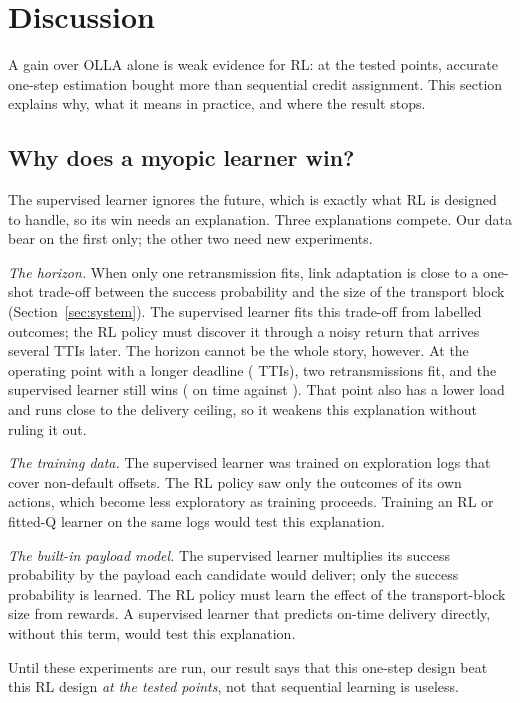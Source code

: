 \section{Discussion}\label{sec:discussion}
A gain over OLLA alone is weak evidence for RL: at the tested points, accurate one-step estimation bought more than sequential credit assignment. This section explains why, what it means in practice, and where the result stops.

\subsection{Why does a myopic learner win?}\label{sec:myopic}
The supervised learner ignores the future, which is exactly what RL is designed to handle, so its win needs an explanation. Three explanations compete. Our data bear on the first only; the other two need new experiments.

\emph{The horizon.} When only one retransmission fits, link adaptation is close to a one-shot trade-off between the success probability and the size of the transport block (Section~\ref{sec:system}). The supervised learner fits this trade-off from labelled outcomes; the RL policy must discover it through a noisy return that arrives several TTIs later. The horizon cannot be the whole story, however. At the operating point with a longer deadline (\NGthreeDeadline{} TTIs), two retransmissions fit, and the supervised learner still wins ( on time against ). That point also has a lower load and runs close to the delivery ceiling, so it weakens this explanation without ruling it out.

\emph{The training data.} The supervised learner was trained on exploration logs that cover non-default offsets. The RL policy saw only the outcomes of its own actions, which become less exploratory as training proceeds. Training an RL or fitted-Q learner on the same logs would test this explanation.

\emph{The built-in payload model.} The supervised learner multiplies its success probability by the payload each candidate would deliver; only the success probability is learned. The RL policy must learn the effect of the transport-block size from rewards. A supervised learner that predicts on-time delivery directly, without this term, would test this explanation.

Until these experiments are run, our result says that this one-step design beat this RL design \emph{at the tested points}, not that sequential learning is useless.

